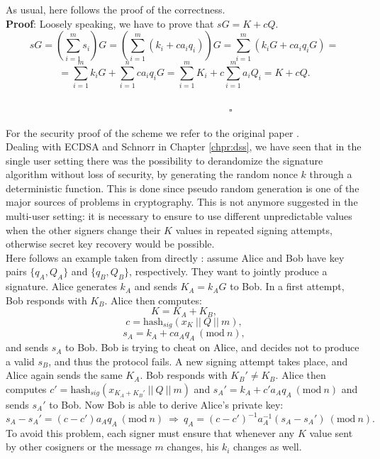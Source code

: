 \bigskip
\noindent
As usual, here follows the proof of the correctness.
\\
{\bf Proof}: Loosely speaking, we have to prove that $sG = K + cQ$.
\\
$$sG = \left(\sum_{i = 1}^{m} s_i\right)G = \left(\sum_{i = 1}^{m}(k_i + ca_iq_i)\right)G = \sum_{i = 1}^{m}(k_iG + ca_iq_iG) =$$
$$= \sum_{i = 1}^{m}k_iG + \sum_{i = 1}^{n} ca_iq_iG = \sum_{i = 1}^{m}K_i + c\sum_{i  = 1}^{m}a_iQ_i = K + cQ.$$
\ \ \ \ \ \ \ \ \ \ \ \ \ \ \ \ \ \ \ \ \ \ \ \ \ \ \ \ \ \ \ \ \ \ \ \ \ \ \ \ \ \ \ \ \ \ \ \ \ \ \ \ \ \ \ \ \ \ \ \ \ \ \ \ \ \ \ \ \ \ \ \ \ \ \ \ \ \ \ \ \ \ \ \ \ \ \ \ \ \ \ \ \ \ \ \ \ \ \ \ \ \ \ \ \ \ \ \ \ \ \ \ \ \ \ \ \ $\square$

\bigskip
\noindent
For the security proof of the scheme we refer to the original paper \cite{RefWork:11}. 
\\
Dealing with ECDSA and Schnorr in Chapter \ref{chpr:dss}, we have seen that in the single user setting there was the possibility to derandomize the signature algorithm without loss of security, by generating the random nonce $k$ through a deterministic function. This is done since pseudo random generation is one of the major sources of problems in cryptography. This is not anymore suggested in the multi-user setting: it is necessary to ensure to use different unpredictable values when the other signers change their $K$ values in repeated signing attempts, otherwise secret key recovery would be possible. 
\\
Here follows an example taken from directly \cite{RefWork:11}: assume Alice and Bob have key pairs $\{q_A, Q_A\}$ and $\{q_B, Q_B\}$, respectively. They want to jointly produce a signature. Alice generates $k_A$ and sends $K_A = k_AG$ to Bob. In a first attempt, Bob responds with $K_B$. Alice then computes:
$$K = K_A + K_B,$$
$$c = \text{hash}_{sig}(x_K \ || \ Q \ || \ m),$$
$$s_A = k_A + ca_Aq_A \ (\text{mod} \ n),$$
and sends $s_A$ to Bob. Bob is trying to cheat on Alice, and decides not to produce a valid $s_B$, and thus the protocol fails. A new signing attempt takes place, and Alice again sends the same $K_A$. Bob responds with $K_B' \neq K_B$. Alice then computes $c' = \text{hash}_{sig}(x_{K_A + K_B'} \ || \ Q \ || \ m)$ and $s_A' = k_A + c'a_Aq_A \ (\text{mod} \ n)$ and sends $s_A'$ to Bob. Now Bob is able to derive Alice's private key:
$$s_A - s_A' = (c - c')a_Aq_A \ (\text{mod} \ n) \ \Longrightarrow \ q_A = (c - c')^{-1}a_A^{-1}(s_A - s_A') \ (\text{mod} \ n).$$
To avoid this problem, each signer must ensure that whenever any $K$ value sent by other cosigners or the message $m$ changes, his $k_i$ changes as well. 

